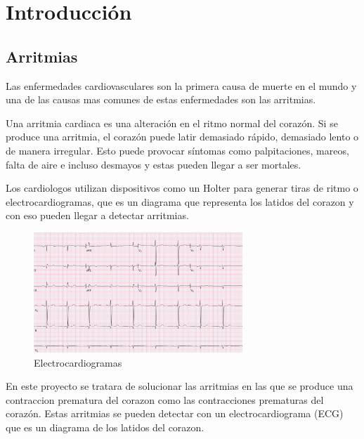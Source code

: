 \titlespacing*{\chapter}{0pt}{-1.25cm}{25pt}
\chapter{Introducción}
\section{Arritmias}
Las enfermedades cardiovasculares son la primera causa de muerte en el mundo y una de las causas mas comunes
de estas enfermedades son las arritmias.

Una arritmia cardiaca es una alteración en el ritmo normal del corazón. Si se produce una arritmia, el corazón 
puede latir demasiado rápido, demasiado lento o de manera irregular. Esto puede provocar síntomas como palpitaciones,
mareos, falta de aire e incluso desmayos y estas pueden llegar a ser mortales.

Los cardiologos utilizan dispositivos como un Holter para generar tiras de ritmo o electrocardiogramas, que es un 
diagrama que representa los latidos del corazon y con eso pueden llegar a detectar arritmias.

\begin{figure}[h!]
	\centering
	\includegraphics[width=0.7\textwidth]{./Images/img_introduccion/electrocardiograma.png}
	\caption{Electrocardiogramas}
	\label{fig:electrocardiogramas}
\end{figure}

En este proyecto se tratara de solucionar las arritmias en las que se produce una contraccion prematura del corazon
como las contracciones prematuras del corazón. Estas arritmias se 
pueden detectar con un electrocardiograma (ECG) que es un diagrama de los latidos del corazon.



